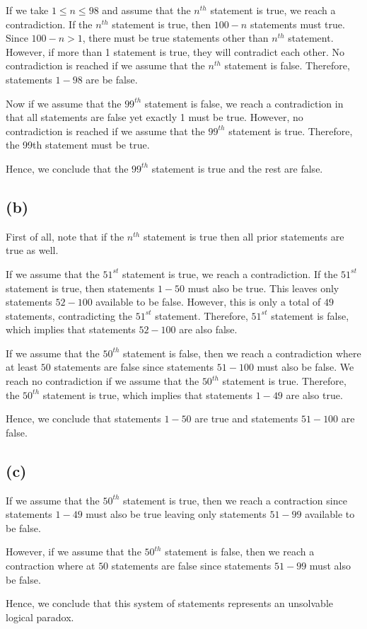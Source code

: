 \documentclass{article}
\begin{document}
If we take $1 \le n \le 98$ and assume that the $n^{th}$ statement is true, we reach a contradiction. If the $n^{th}$ statement is true, then $100 - n$ statements must true. Since $100 - n > 1$, there must be true statements other than $n^{th}$ statement. However, if more than 1 statement is true, they will contradict each other. No contradiction is reached if we assume that the $n^{th}$ statement is false. Therefore, statements $1-98$ are be false.

Now if we assume that the $99^{th}$ statement is false, we reach a contradiction in that all statements are false yet exactly 1 must be true. However, no contradiction is reached if we assume that the $99^{th}$ statement is true. Therefore, the 99th statement must be true.

Hence, we conclude that the $99^{th}$ statement is true and the rest are false.

\subsection{(b)}
First of all, note that if the $n^{th}$ statement is true then all prior statements are true as well.

If we assume that the $51^{st}$ statement is true, we reach a contradiction. If the $51^{st}$ statement is true, then statements $1-50$ must also be true. This leaves only statements $52-100$ available to be false. However, this is only a total of $49$ statements, contradicting the $51^{st}$ statement. Therefore, $51^{st}$ statement is false, which implies that statements $52-100$ are also false.

If we assume that the $50^{th}$ statement is false, then we reach a contradiction where at least $50$ statements are false since statements $51-100$ must also be false.  We reach no contradiction if we assume that the $50^{th}$ statement is true. Therefore, the $50^{th}$ statement is true, which implies that statements $1-49$ are also true.

Hence, we conclude that statements $1-50$ are true and statements $51-100$ are false.

\subsection{(c)}
If we assume that the $50^{th}$ statement is true, then we reach a contraction since statements $1-49$ must also be true leaving only statements $51-99$ available to be false.

However, if we assume that the $50^{th}$ statement is false, then we reach a contraction where at $50$ statements are false since statements $51-99$ must also be false.

Hence, we conclude that this system of statements represents an unsolvable logical paradox.
\end{document}
